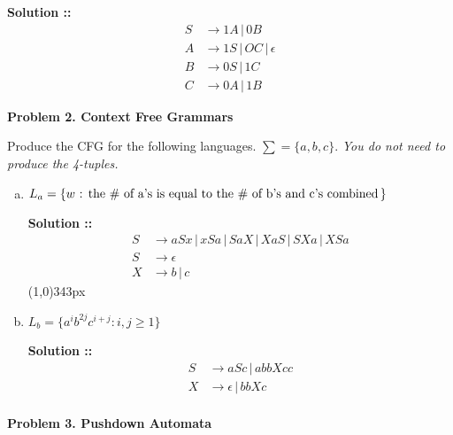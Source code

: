 \documentclass[11pt]{article}
\begin{document}
\begin{enumerate}[a)]
\vspace{5px}\textbf{Solution ::}
\begin{align}
    S&\longrightarrow 1A \,|\, 0B \\
    A&\longrightarrow 1S\,|\, OC \,|\, \epsilon \\
    B&\longrightarrow 0S \,|\, 1C \\
    C&\longrightarrow 0A \,|\, 1B
\end{align}
\end{enumerate}

\pagebreak


\textbf{Problem 2. Context Free Grammars}

Produce the CFG for the following languages. $\sum = \{a,b,c\}$. \textit{You do not need
to produce the 4-tuples.}
\begin{enumerate}[a)]
\item 
$L_a = \{w \text{ : the \# of a's is equal to the \# of b's and c's combined\,}\}$

\vspace{5px}\textbf{Solution ::}
\begin{align}
    S&\longrightarrow aSx \,|\, xSa \,|\, SaX \,|\, XaS \,|\, SXa \,|\, XSa \\
    S&\longrightarrow \epsilon \\
    X&\longrightarrow b \,|\, c
\end{align}
\line(1,0){343px}

\item 
$L_b=\{a^ib^{2j}c^{i+j} : i, j \ge 1\}$

\vspace{5px}\textbf{Solution ::}
\begin{align}
    S&\longrightarrow aSc \,|\, abbXcc \\
    X&\longrightarrow \epsilon \,|\, bbXc \\
\end{align}
\end{enumerate}

\pagebreak


\textbf{Problem 3. Pushdown Automata}
\end{document}
